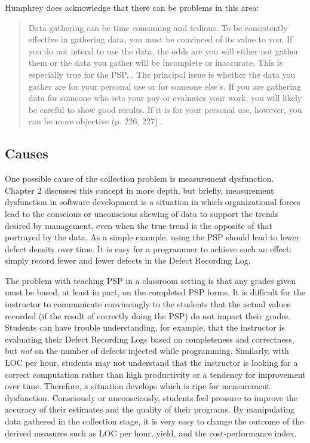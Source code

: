 Humphrey does acknowledge that there can be problems in this area:
\begin{quote}
Data gathering can be time consuming and tedious.  To be consistently
effective in gathering data, you must be convinced of its value to you.  If 
you do not intend to use the data, the odds are you will either not gather
them or the data you gather will be incomplete or inaccurate.  This is
especially true for the PSP... The principal issue is whether the data you
gather are for your personal use or for someone else's.  If you are
gathering data for someone who sets your pay or evaluates your work, you
will likely be careful to show good results.  If it is for your personal
use, however, you can be more objective (p. 226, 227) \cite{Humphrey95}.
\end{quote}

\subsection{Causes}

One possible cause of the collection problem is measurement dysfunction.
Chapter 2 discusses this concept in more depth, but briefly, measurement
dysfunction in software development is a situation in which organizational
forces lead to the conscious or unconscious skewing of data to support the
trends desired by management, even when the true trend is the opposite of
that portrayed by the data.  As a simple example, using the PSP should lead
to lower defect density over time.  It is easy for a programmer to achieve
such an effect: simply record fewer and fewer defects in the Defect
Recording Log.

The problem with teaching PSP in a classroom setting is that any grades
given must be based, at least in part, on the completed PSP forms.  It is
difficult for the instructor to communicate convincingly to the students
that the actual values recorded (if the result of correctly doing the PSP)
do not impact their grades.  Students can have trouble understanding, for
example, that the instructor is evaluating their Defect Recording Logs
based on completeness and correctness, but {\it not} on the number of
defects injected while programming.  Similarly, with LOC per hour, students
may not understand that the instructor is looking for a correct computation
rather than high productivity or a tendency for improvement over time.
Therefore, a situation develops which is ripe for measurement dysfunction.
Consciously or unconsciously, students feel pressure to improve the
accuracy of their estimates and the quality of their programs.  By
manipulating data gathered in the collection stage, it is very easy to
change the outcome of the derived measures such as LOC per hour, yield, and
the cost-performance index.

